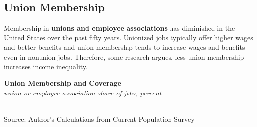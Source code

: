 \documentclass{report}
\makeatletter
\newcommand{\tbllink}[1]{\href{https://raw.githubusercontent.com/bdecon/US-chartbook/master/chartbook/data/#1}{\faTable}}
\newcommand*\short[1]{\expandafter\@gobbletwo\number\numexpr#1\relax}
\newcommand{\ctsbar}[5]{
		\addplot[ybar stacked, bar width=#5, draw opacity=0, fill=#1] 
			table [x=#2, y=#3, col sep=comma]{#4};}
\newcommand{\dateaxisticks}{
		date coordinates in=x, axis line style={draw=none},
		xmax={2021-06-15},
		max space between ticks=40,	    
		xtick={{1990-01-01}, {1992-01-01}, {1994-01-01}, 
			{1996-01-01}, {1998-01-01}, {2000-01-01}, 
			{2002-01-01}, {2004-01-01}, {2006-01-01},
			{2008-01-01}, {2010-01-01}, {2012-01-01}, {2014-01-01},
		    {2016-01-01}, {2018-01-01}, {2020-01-01}},
		minor xtick={{1989-01-01}, {1991-01-01}, {1993-01-01},
			{1995-01-01}, {1997-01-01}, {1999-01-01}, 
			{2001-01-01}, {2003-01-01}, {2005-01-01}, {2007-01-01},
		    {2009-01-01}, {2011-01-01}, {2013-01-01}, {2015-01-01},
		    {2017-01-01}, {2019-01-01}, {2021-01-01}},
		enlarge y limits={0.06}, enlarge x limits={0.01},
		}
\newcommand{\bbar}[2]{extra #1 ticks = {{#2}}, extra #1 tick labels = ,
		extra #1 tick style = {grid=major, grid style={thick, black!25}},}
\newcommand{\rbars}{
		\fill[color=black!10] (axis cs:{1990-07-01},\pgfkeysvalueof{/pgfplots/ymin}) rectangle 
			(axis cs:{1991-03-01}, \pgfkeysvalueof{/pgfplots/ymax});
		\fill[color=black!10] (axis cs:{2007-12-01},\pgfkeysvalueof{/pgfplots/ymin}) rectangle 
			(axis cs:{2009-07-01}, \pgfkeysvalueof{/pgfplots/ymax});
		\fill[color=black!10] (axis cs:{2001-03-01},\pgfkeysvalueof{/pgfplots/ymin}) rectangle 
			(axis cs:{2001-11-01}, \pgfkeysvalueof{/pgfplots/ymax});
		\fill[color=black!10] (axis cs:{2020-02-01},\pgfkeysvalueof{/pgfplots/ymin}) rectangle 
			(axis cs:{2021-06-15}, \pgfkeysvalueof{/pgfplots/ymax});}
\makeatother
\begin{document}
{{\begin{minipage}{0.76\textwidth}
\subsection*{\color{black!70} \seriffont Union Membership}
\small Membership in \textbf{unions and employee associations} has diminished in the United States over the past fifty years. Unionized jobs typically offer higher wages and better benefits and union membership tends to increase wages and benefits even in nonunion jobs. Therefore, some research argues, less union membership increases income inequality. 


\vspace{3mm}

\normalsize \textbf{Union Membership and Coverage}\\
\footnotesize{\textit{union or employee association share of jobs, percent}}\\
\hspace*{-2mm} \\
\footnotesize{Source: Author's Calculations from Current Population Survey} \hfill \tbllink{union.csv}
\end{minipage}
\vspace{2mm}

}}
\end{document}
